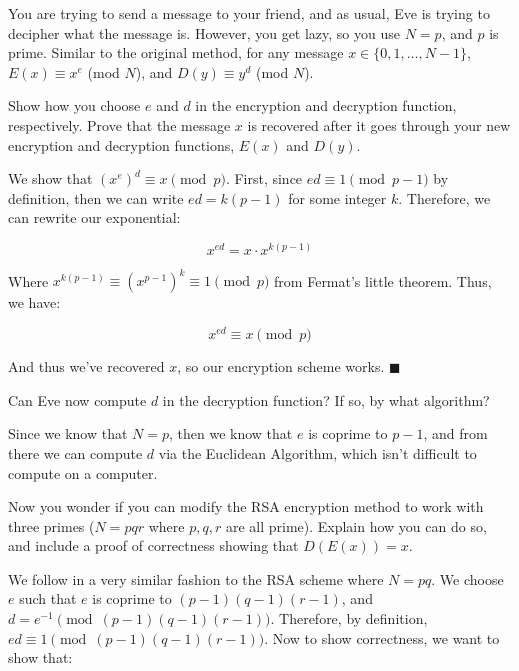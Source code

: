 \documentclass[11pt]{article}
\begin{document}
\pagebreak
{}
You are trying to send a message to your friend, and as usual, Eve is trying to decipher what the message is.
  However, you get lazy, so you use $N = p$, and $p$ is prime.
  Similar to the original method, for any message $x \in \{0,1, \ldots, N-1\}$, $E(x) \equiv x^e$ (mod $N$), and $D(y) \equiv y^d$ (mod $N$).
\begin{Parts}
  \Part
  Show how you choose $e$ and $d$ in the encryption and decryption function, respectively. Prove that the message $x$ is recovered after it goes through your new encryption and decryption functions, $E(x)$ and $D(y)$.

  \begin{solution}
    We show that $(x^e)^d \equiv x \pmod p$. First, since $ed \equiv 1 \pmod{p -1}$ by definition, then we can write $ed = k(p - 1)$ for some integer $k$. Therefore, we can rewrite our exponential:

    \[ x^{ed} = x \cdot x^{k(p - 1)}\]

    Where $x^{k(p - 1)} \equiv \left(x^{p -1}\right)^k \equiv 1 \pmod p$ from Fermat's little theorem. Thus, we have:

    \[ x^{ed} \equiv x \pmod p\]

    And thus we've recovered $x$, so our encryption scheme works. $\blacksquare$
  \end{solution}

    \Part
    Can Eve now compute $d$ in the decryption function? If so, by what algorithm?

    \begin{solution}
        Since we know that $N = p$, then we know that $e$ is coprime to $p -1$, and from there we can compute $d$ via the Euclidean Algorithm, which isn't difficult to compute on a computer.
    \end{solution}

    \Part Now you wonder if you can modify the RSA encryption method to work with three primes ($N = pqr$ where $p, q, r$ are all prime). Explain how you can do so, and include a proof of correctness showing that $D(E(x)) = x$.


    \begin{solution}
        We follow in a very similar fashion to the RSA scheme where $N = pq$. We choose $e$ such that $e$ is coprime to $(p - 1)(q - 1)(r - 1)$, and $d = e^{-1} \pmod{(p - 1)(q - 1)(r - 1)}$. Therefore, by definition, $ed \equiv 1 \pmod{(p - 1)(q - 1)(r - 1)}$. Now to show correctness, we want to show that:


\end{solution}
\end{Parts}
\end{document}
